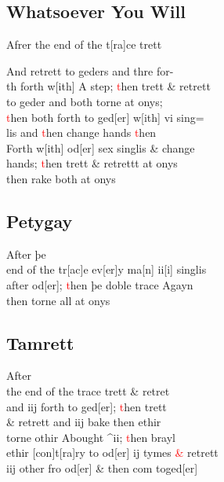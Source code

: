 \documentclass[12pt,letter]{article} %
\newcommand{\red}[1]{\textcolor{red}{#1}}
\newcommand{\srcpg}[1]{
    \noindent{
        \color{Gray}{\rule[0.5ex]{\linewidth}{1pt}~#1} 
    
    }
}
\begin{document}
\subsection{Whatsoever You Will}
Afrer the end of the t{[}ra{]}ce trett 
\srcpg{62}
And retrett to geders and thre for-\\
th forth w{[}ith{]} A step; \red{t}hen trett \& retrett\\
to geder and both torne at onys;\\
\red{t}hen both forth to ged{[}er{]} w{[}ith{]} vi sing=\\
lis and \red{t}hen change hands \red{t}hen\\
Forth w{[}ith{]} od{[}er{]} sex singlis \& change\\
hands; \red{t}hen trett \& retrettt at onys\\
then rake both at onys

\subsection{Petygay}
After þe\\
end of the tr{[}ac{]}e ev{[}er{]}y ma{[}n{]} ii{[}i{]} singlis\\
after od{[}er{]}; \red{t}hen þe doble trace Agayn\\
then torne all at onys

\subsection{Tamrett}
After\\
the end of the trace trett \& retret\\
and iij forth to ged{[}er{]}; \red{t}hen trett\\
\& retrett and iij bake then ethir\\
torne othir Abought \^{}ii; \red{t}hen brayl\\
ethir {[}con{]}t{[}ra{]}ry to od{[}er{]} ij tymes \red{\&} retrett\\
iij other fro od{[}er{]} \& then com toged{[}er{]}
\end{document}
